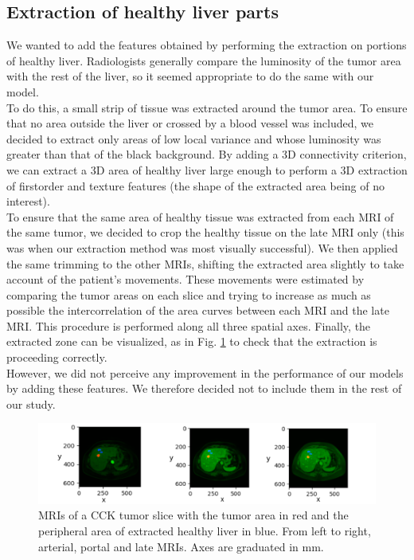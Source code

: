 \documentclass[preprint,12pt]{elsarticle}
\begin{document}
\subsection{Extraction of healthy liver parts}
\noindent We wanted to add the features obtained by performing the extraction on portions of healthy liver. Radiologists generally compare the luminosity of the tumor area with the rest of the liver, so it seemed appropriate to do the same with our model.\\
\indent To do this, a small strip of tissue was extracted around the tumor area. To ensure that no area outside the liver or crossed by a blood vessel was included, we decided to extract only areas of low local variance and whose luminosity was greater than that of the black background. By adding a 3D connectivity criterion, we can extract a 3D area of healthy liver large enough to perform a 3D extraction of firstorder and texture features (the shape of the extracted area being of no interest).\\
\indent To ensure that the same area of healthy tissue was extracted from each MRI of the same tumor, we decided to crop the healthy tissue on the late MRI only (this was when our extraction method was most visually successful). We then applied the same trimming to the other MRIs, shifting the extracted area slightly to take account of the patient's movements. These movements were estimated by comparing the tumor areas on each slice and trying to increase as much as possible the intercorrelation of the area curves between each MRI and the late MRI. This procedure is performed along all three spatial axes. Finally, the extracted zone can be visualized, as in Fig. \ref{fig:healthy_zone} to check that the extraction is proceeding correctly.\\
\indent However, we did not perceive any improvement in the performance of our models by adding these features. We therefore decided not to include them in the rest of our study.\\

\begin{figure}[tbp]
    \centering
    \includegraphics[scale = 0.5]{./images/sain.png}
    \caption{MRIs of a CCK tumor slice with the tumor area in red and the peripheral area of extracted healthy liver in blue. From left to right, arterial, portal and late MRIs. Axes are graduated in mm.}
    \label{fig:healthy_zone}
\end{figure}
\end{document}
